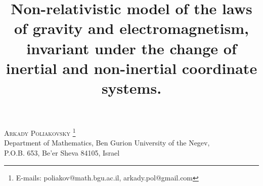 \documentclass{article}
\date{}
\theoremstyle{definition}
\theoremstyle{remark}
\begin{document}
\title{
Non-relativistic model of the laws of gravity and electromagnetism,
invariant under the change of inertial and non-inertial coordinate
systems.}
\maketitle
\begin{center}
\textsc{Arkady Poliakovsky \footnote{E-mails:
poliakov@math.bgu.ac.il, arkady.pol@gmail.com}}
\\[3mm]
Department of Mathematics, Ben Gurion University of the Negev,\\
P.O.B. 653, Be'er Sheva 84105, Israel
\\[2mm]
\end{center}
\end{document}

